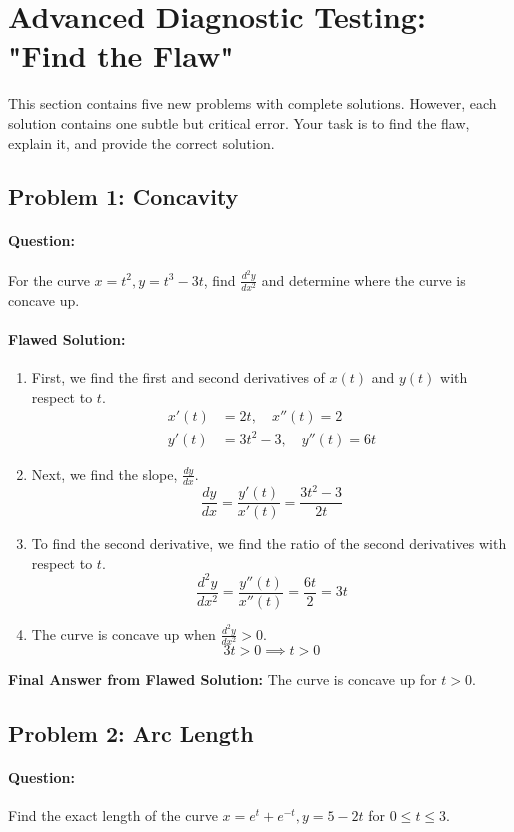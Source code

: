 \documentclass{article}
\begin{document}
\newpage
\section{Advanced Diagnostic Testing: "Find the Flaw"}
This section contains five new problems with complete solutions. However, each solution contains one subtle but critical error. Your task is to find the flaw, explain it, and provide the correct solution.

\subsection{Problem 1: Concavity}
\paragraph{Question:} For the curve $x=t^2, y=t^3-3t$, find $\frac{d^2y}{dx^2}$ and determine where the curve is concave up.

\paragraph{Flawed Solution:}
\begin{enumerate}
    \item First, we find the first and second derivatives of $x(t)$ and $y(t)$ with respect to $t$.
    \begin{align*}
    x'(t) &= 2t, \quad x''(t) = 2 \\
    y'(t) &= 3t^2 - 3, \quad y''(t) = 6t
    \end{align*}
    \item Next, we find the slope, $\frac{dy}{dx}$.
    \[ \frac{dy}{dx} = \frac{y'(t)}{x'(t)} = \frac{3t^2-3}{2t} \]
    \item To find the second derivative, we find the ratio of the second derivatives with respect to $t$.
    \[ \frac{d^2y}{dx^2} = \frac{y''(t)}{x''(t)} = \frac{6t}{2} = 3t \]
    \item The curve is concave up when $\frac{d^2y}{dx^2} > 0$.
    \[ 3t > 0 \implies t > 0 \]
\end{enumerate}
\textbf{Final Answer from Flawed Solution:} The curve is concave up for $t > 0$.

\subsection{Problem 2: Arc Length}
\paragraph{Question:} Find the exact length of the curve $x = e^t + e^{-t}, y = 5 - 2t$ for $0 \le t \le 3$.
\end{document}
